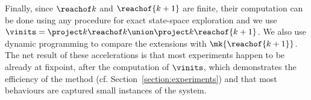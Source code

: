 Finally, since $\reachof k$ and $\reachof {k+1}$ are finite, their
computation can be done using any procedure for exact state-space
exploration and we use $\vinits = \project k {\reachof k} \union
\project k {\reachof {k+1}}$. %
We also use dynamic programming to compare the extensions with
$\mk{\reachof {k+1}}$. %
The net result of these accelerations is that most experiments happen
to be already at fixpoint, after the computation of $\vinits$, which
demonstrates the efficiency of the method
(cf. Section~\ref{section:experiments}) and that most behaviours are
captured small instances of the system.
%
%
%
%

